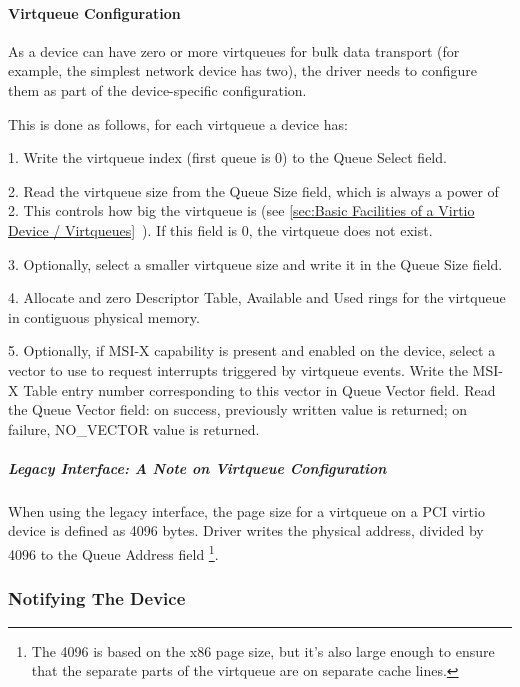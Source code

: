 \paragraph{Virtqueue Configuration}\label{sec:Virtio Transport Options / Virtio Over PCI Bus / PCI-specific Initialization And Device Operation / Device Initialization / Virtqueue Configuration}

As a device can have zero or more virtqueues for bulk data
transport (for example, the simplest network device has two), the driver
needs to configure them as part of the device-specific
configuration.

This is done as follows, for each virtqueue a device has:

1. Write the virtqueue index (first queue is 0) to the Queue
  Select field.

2. Read the virtqueue size from the Queue Size field, which is
  always a power of 2. This controls how big the virtqueue is
  (see \ref{sec:Basic Facilities of a Virtio Device / Virtqueues}~). If this field is 0, the virtqueue does not exist.

3. Optionally, select a smaller virtqueue size and write it in the Queue Size
   field.

4. Allocate and zero Descriptor Table, Available and Used rings for the
   virtqueue in contiguous physical memory.

5. Optionally, if MSI-X capability is present and enabled on the
  device, select a vector to use to request interrupts triggered
  by virtqueue events. Write the MSI-X Table entry number
  corresponding to this vector in Queue Vector field. Read the
  Queue Vector field: on success, previously written value is
  returned; on failure, NO_VECTOR value is returned.

\subparagraph{Legacy Interface: A Note on Virtqueue Configuration}\label{sec:Virtio Transport Options / Virtio Over PCI Bus / PCI-specific Initialization And Device Operation / Device Initialization / Virtqueue Configuration / Legacy Interface: A Note on Virtqueue Configuration}
When using the legacy interface, the page size for a virtqueue on a PCI virtio
device is defined as 4096 bytes.  Driver writes the physical address, divided
by 4096 to the Queue Address field 
\footnote{The 4096 is based on the x86 page size, but it's also large
enough to ensure that the separate parts of the virtqueue are on
separate cache lines.
}.

\subsubsection{Notifying The Device}\label{sec:Virtio Transport Options / Virtio Over PCI Bus / PCI-specific Initialization And Device Operation / Notifying The Device}

